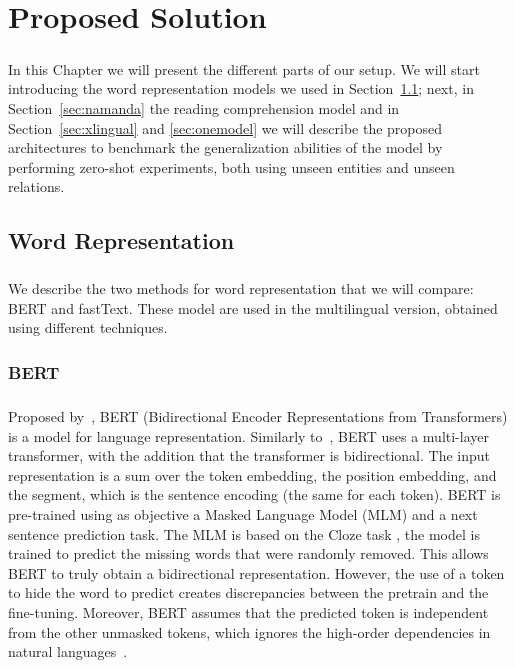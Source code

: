 \chapter{Proposed Solution}
\label{chpt:5}

\paragraph{}
In this Chapter we will present the different parts of our setup. We will start introducing the word representation models we used in Section~\ref{sec:w_e}; next, in Section~\ref{sec:namanda} the reading comprehension model and in Section~\ref{sec:xlingual} and \ref{sec:onemodel} we will describe the proposed architectures to benchmark the generalization abilities of the model by performing zero-shot experiments, both using unseen entities and unseen relations.


\section{Word Representation}
\label{sec:w_e}
\paragraph{}
We describe the two methods for word representation that we will compare: BERT and fastText. These model are used in the multilingual version, obtained using different techniques.

\subsection{BERT}
\paragraph{}
Proposed by~\cite{devlin2018bert}, BERT (Bidirectional Encoder Representations from Transformers) is a model for language representation. Similarly to~\citep{radford2018improving}, BERT uses a multi-layer transformer, with the addition that the transformer is bidirectional. The input representation is a sum over the token embedding, the position embedding, and the segment, which is the sentence encoding (the same for each token). BERT is pre-trained using as objective a Masked Language Model (MLM) and a next sentence prediction task. The MLM is based on the Cloze task \citep{taylor1953cloze}, the model is trained to predict the missing words that were randomly removed. This allows BERT to truly obtain a bidirectional representation. However, the use of a token to hide the word to predict creates discrepancies between the pretrain and the fine-tuning. Moreover, BERT assumes that the predicted token is independent from the other unmasked tokens, which ignores the high-order dependencies in natural languages~\citep{yang2019xlnet}.


